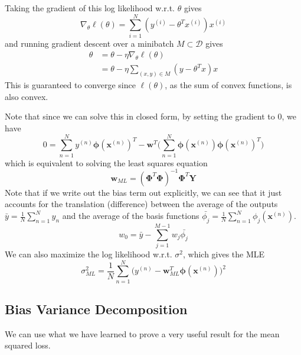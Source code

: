 \documentclass{article}
\begin{document}
    \begin{theorem}
      Taking the gradient of this log likelihood w.r.t. $\theta$ gives 
      \[\nabla_\theta \ell (\theta) = \sum_{i=1}^N ( y^{(i)} - \theta^T x^{(i)}) x^{(i)} \]
      and running gradient descent over a minibatch $M \subset \mathcal{D}$ gives 
      \begin{align*}
          \theta & = \theta - \eta \nabla_\theta \ell (\theta) \\
          & = \theta - \eta \sum_{(x, y) \in M} (y - \theta^T x) x
      \end{align*}
      This is guaranteed to converge since $\ell(\theta)$, as the sum of convex functions, is also convex. 

      Note that since we can solve this in closed form, by setting the gradient to $0$, we have 
      \[0 = \sum_{n=1}^N y^{(n)} \boldsymbol{\phi}(\mathbf{x}^{(n)})^T - \mathbf{w}^T \bigg( \sum_{n=1}^N \boldsymbol{\phi}(\mathbf{x}^{(n)}) \boldsymbol{\phi}(\mathbf{x}^{(n)})^T \bigg)\]
      which is equivalent to solving the least squares equation 
      \[\mathbf{w}_{ML} = ( \boldsymbol{\Phi}^T \boldsymbol{\Phi})^{-1} \boldsymbol{\Phi}^T \mathbf{Y}\]
      Note that if we write out the bias term out explicitly, we can see that it just accounts for the translation (difference) between the average of the outputs $\bar{y} = \frac{1}{N} \sum_{n=1}^N y_n$ and the average of the basis functions $\bar{\phi_j} = \frac{1}{N} \sum_{n=1}^N \phi_j (\mathbf{x}^{(n)})$. 
      \[w_0 = \bar{y} - \sum_{j=1}^{M-1} w_j \bar{\phi_j}\]
      We can also maximize the log likelihood w.r.t. $\sigma^2$, which gives the MLE 
      \[\sigma^2_{ML} = \frac{1}{N} \sum_{n=1}^N \big( y^{(n)} - \mathbf{w}^T_{ML} \boldsymbol{\phi}(\mathbf{x}^{(n)}) \big)^2\]
      
    \end{theorem}

  \subsection{Bias Variance Decomposition} 

    We can use what we have learned to prove a very useful result for the mean squared loss. 
\end{document}
